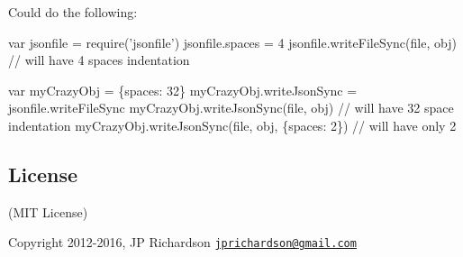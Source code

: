 Could do the following\+:


\begin{DoxyCode}
var jsonfile = require('jsonfile')
jsonfile.spaces = 4
jsonfile.writeFileSync(file, obj) // will have 4 spaces indentation

var myCrazyObj = \{spaces: 32\}
myCrazyObj.writeJsonSync = jsonfile.writeFileSync
myCrazyObj.writeJsonSync(file, obj) // will have 32 space indentation
myCrazyObj.writeJsonSync(file, obj, \{spaces: 2\}) // will have only 2
\end{DoxyCode}


\subsection*{License }

(M\+IT License)

Copyright 2012-\/2016, JP Richardson \href{mailto:jprichardson@gmail.com}{\tt jprichardson@gmail.\+com} 